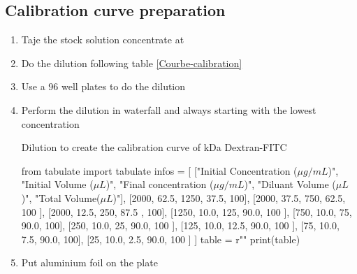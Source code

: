\subsection{Calibration curve preparation}

\begin{enumerate}
\item Taje the stock solution concentrate at  
\item Do the dilution following table \ref{Courbe-calibration}
\item Use a 96 well plates to do the dilution
\item Perform the dilution in waterfall and always starting with the lowest concentration  
\begin{table}[H]
\caption{Dilution to create the calibration curve of  kDa Dextran-FITC}
\label{Courbe-calibration}
\begin{pycode}

from tabulate import tabulate
infos = [
    ["Initial Concentration ($\mu g/mL$)", "Initial Volume ($\mu L$)", "Final concentration ($\mu g/mL$)", "Diluant Volume ($\mu L$)",  "Total Volume($\mu L$)"],
    [2000, 62.5, 1250, 37.5, 100],
    [2000, 37.5, 750, 62.5, 100 ],
    [2000, 12.5, 250, 87.5 , 100],
    [1250, 10.0, 125, 90.0, 100 ],
    [750, 10.0, 75, 90.0, 100],
    [250, 10.0, 25, 90.0, 100 ],
    [125, 10.0, 12.5, 90.0, 100 ],
    [75, 10.0, 7.5, 90.0, 100],
    [25, 10.0, 2.5, 90.0, 100 ]
]
table = r""
print(table)
\end{pycode}
\label{table-ensemencement}
\end{table}

\item Put aluminium foil on the plate
\end{enumerate}